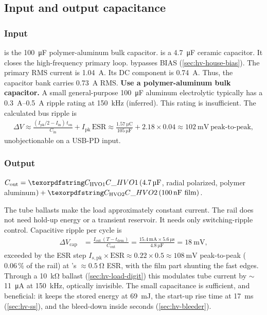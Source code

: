 \subsection{Input and output capacitance}\label{sec:hv-caps}

\subsubsection{Input}

 is the \SI{100}{\micro\farad} polymer-aluminum bulk capacitor.
 is a \SI{4.7}{\micro\farad} ceramic capacitor. It closes the
high-frequency primary loop.  bypasses BIAS
(\cref{sec:hv-house-bias}). The primary RMS current is
\SI{1.04}{\ampere}. Its DC component is \SI{0.74}{\ampere}. Thus, the capacitor
bank carries \SI{0.73}{\ampere} RMS. \textbf{Use a polymer-aluminum bulk
capacitor.} A small general-purpose \SI{100}{\micro\farad} aluminum
electrolytic typically has a \SIrange{0.3}{0.5}{\ampere} ripple rating at
\SI{150}{\kilo\hertz} (inferred). This rating is insufficient. The calculated
bus ripple is
\begin{align*}
  \Delta V \approx
  \frac{(I_{\mathrm{pk}}/2 - I_{\mathrm{in}})\,t_{\mathrm{on}}}{C_{\mathrm{in}}}
  + I_{\mathrm{pk}}\,\mathrm{ESR}
  \approx \frac{\SI{1.57}{\micro\coulomb}}{\SI{105}{\micro\farad}} + 2.18\times0.04
  \approx \SI{102}{\milli\volt}\ \text{peak-to-peak},
\end{align*}
unobjectionable on a USB-PD input.

\subsubsection{Output}

$C_{\mathrm{out}} = \des{C}{HVO1}\,(\SI{4.7}{\micro\farad}$, radial polarized, polymer
aluminum$) + \des{C}{HVO2}\,(\SI{100}{\nano\farad}\ \text{film})$.

The tube ballasts make the load approximately constant current. The rail does
not need hold-up energy or a transient reservoir. It needs only
switching-ripple control. Capacitive ripple per cycle is
\begin{align*}
  \Delta V_{\mathrm{cap}} &=
  \frac{I_{\mathrm{out}}\,(T - t_{\mathrm{dem}})}{C_{\mathrm{out}}}
  = \frac{15.4\,\si{\milli\ampere} \times 5.6\,\si{\micro\second}}
         {\SI{4.8}{\micro\farad}}
  = \SI{18}{\milli\volt},
\end{align*}
exceeded by the ESR step $I_{s,\mathrm{pk}}\times\mathrm{ESR} \approx 0.22 \times
0.5 \approx \SI{108}{\milli\volt}$ peak-to-peak ($0.06\,\%$ of the rail) at
's $\approx\SI{0.5}{\ohm}$ ESR, with the film part shunting the
fast edges.
Through a \SI{10}{\kilo\ohm} ballast (\cref{sec:hv-load-digit}) this modulates
tube current by $\sim$\SI{11}{\micro\ampere} at \SI{150}{\kilo\hertz},
optically invisible. The small capacitance is sufficient, and beneficial: it
keeps the stored energy at \SI{69}{\milli\joule}, the start-up rise time at
\SI{17}{\milli\second} (\cref{sec:hv-ss}), and the bleed-down inside seconds
(\cref{sec:hv-bleeder}).

